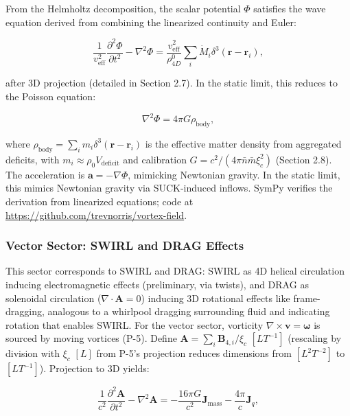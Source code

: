 From the Helmholtz decomposition, the scalar potential $\Phi$ satisfies the wave equation derived from combining the linearized continuity and Euler:

\begin{equation}
\frac{1}{v_{\text{eff}}^2} \frac{\partial^2 \Phi}{\partial t^2} - \nabla^2 \Phi = \frac{v_{\text{eff}}^2}{\rho_{4D}^0} \sum_i \dot{M}_i \delta^3(\mathbf{r} - \mathbf{r}_i),
\end{equation}

after 3D projection (detailed in Section 2.7). In the static limit, this reduces to the Poisson equation:

\begin{equation}
\nabla^2 \Phi = 4\pi G \rho_{\text{body}},
\end{equation}

where $\rho_{\text{body}} = \sum_i m_i \delta^3(\mathbf{r} - \mathbf{r}_i)$ is the effective matter density from aggregated deficits, with $m_i \approx \rho_0 V_{\text{deficit}}$ and calibration $G = c^2 / (4\pi \bar{n} \bar{m} \xi_c^2)$ (Section 2.8). The acceleration is $\mathbf{a} = -\nabla \Phi$, mimicking Newtonian gravity. In the static limit, this mimics Newtonian gravity via SUCK-induced inflows. SymPy verifies the derivation from linearized equations; code at \url{https://github.com/trevnorris/vortex-field}.

\subsubsection{Vector Sector: SWIRL and DRAG Effects}

This sector corresponds to SWIRL and DRAG: SWIRL as 4D helical circulation inducing electromagnetic effects (preliminary, via twists), and DRAG as solenoidal circulation ($\nabla \cdot \mathbf{A} = 0$) inducing 3D rotational effects like frame-dragging, analogous to a whirlpool dragging surrounding fluid and indicating rotation that enables SWIRL. For the vector sector, vorticity $\nabla \times \mathbf{v} = \boldsymbol{\omega}$ is sourced by moving vortices (P-5). Define $\mathbf{A} = \sum_i \mathbf{B}_{4,i} / \xi_c$ $[L T^{-1}]$ (rescaling by division with $\xi_c$ $[L]$ from P-5's projection reduces dimensions from $[L^2 T^{-2}]$ to $[L T^{-1}]$). Projection to 3D yields:

\begin{equation}
\frac{1}{c^2} \frac{\partial^2 \mathbf{A}}{\partial t^2} - \nabla^2 \mathbf{A} = -\frac{16\pi G}{c^2} \mathbf{J}_{\text{mass}} - \frac{4\pi}{c} \mathbf{J}_q,
\end{equation}

